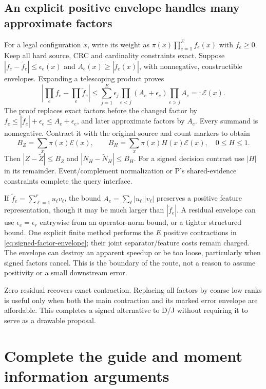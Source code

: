 \documentclass[10pt,a4paper]{article}
\begin{document}
\subsection{An explicit positive envelope handles many approximate factors}
For a legal configuration $x$, write its weight as $\pi(x)\prod_{e=1}^E f_e(x)$ with $f_e\geq0$.
Keep all hard source, CRC and cardinality constraints exact. Suppose
$|f_e-\widetilde f_e|\leq\epsilon_e(x)$ and
$A_e(x)\geq|\widetilde f_e(x)|$, with nonnegative, constructible envelopes.
Expanding a telescoping product proves
\begin{equation}
 \left|\prod_e f_e-\prod_e\widetilde f_e\right|
 \leq\sum_{j=1}^E\epsilon_j
          \prod_{e<j}(A_e+\epsilon_e)\prod_{e>j}A_e
 =:\mathcal E(x).
 \label{eq:signed-factor-envelope}
\end{equation}
The proof replaces exact factors before the changed factor by
$f_e\leq|\widetilde f_e|+\epsilon_e\leq A_e+\epsilon_e$, and later approximate factors by $A_e$.
Every summand is nonnegative. Contract it with the original source and count markers to obtain
\[
 B_Z=\sum_x\pi(x)\mathcal E(x),\qquad
 B_H=\sum_x\pi(x)H(x)\mathcal E(x),\quad 0\leq H\leq1.
\]
Then $|Z-\widetilde Z|\leq B_Z$ and $|N_H-\widetilde N_H|\leq B_H$.
For a signed decision contrast use $|H|$ in its remainder.
Event/complement normalization or P's shared-evidence constraints complete the query interface.

If $\widetilde f_e=\sum_{\ell=1}^r u_\ell v_\ell$, the bound
$A_e=\sum_\ell|u_\ell||v_\ell|$ preserves a positive feature representation, though it may be much
larger than $|\widetilde f_e|$. A residual envelope can use
$\epsilon_e=\epsilon_r$ entrywise from an operator-norm bound, or a tighter structured bound.
One explicit finite method performs the $E$ positive contractions in
\eqref{eq:signed-factor-envelope}; their joint separator/feature costs remain charged.
The envelope can destroy an apparent speedup or be too loose, particularly when signed factors cancel.
This is the boundary of the route, not a reason to assume positivity or a small downstream error.

Zero residual recovers exact contraction. Replacing all factors by coarse low ranks is useful only when
both the main contraction and its marked error envelope are affordable. This completes a signed
alternative to D/J without requiring it to serve as a drawable proposal.

\clearpage
\section{Complete the guide and moment information arguments}
\label{sec:guide-moment-completion}
\end{document}
